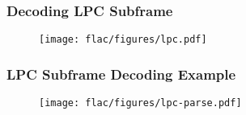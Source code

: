 \clearpage

\subsubsection{Decoding LPC Subframe}
\label{flac:decode_lpc}
{
  
}
\begin{figure}[h]
\texttt{[image: flac/figures/lpc.pdf]}
\end{figure}

\clearpage

\subsubsection{LPC Subframe Decoding Example}

\begin{figure}[h]
\texttt{[image: flac/figures/lpc-parse.pdf]}
\end{figure}
